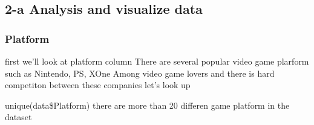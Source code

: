 \documentclass[]{article}
\newenvironment{Shaded}{\begin{snugshade}}{\end{snugshade}}
\newcommand{\DataTypeTok}[1]{\textcolor[rgb]{0.13,0.29,0.53}{#1}}
\newcommand{\KeywordTok}[1]{\textcolor[rgb]{0.13,0.29,0.53}{\textbf{#1}}}
\newcommand{\NormalTok}[1]{#1}
\newcommand{\OperatorTok}[1]{\textcolor[rgb]{0.81,0.36,0.00}{\textbf{#1}}}
\newcommand{\StringTok}[1]{\textcolor[rgb]{0.31,0.60,0.02}{#1}}
\begin{document}
\hypertarget{a-analysis-and-visualize-data}{%
\subsection{2-a Analysis and visualize
data}\label{a-analysis-and-visualize-data}}

\hypertarget{platform}{%
\subsubsection{Platform}\label{platform}}

first we'll look at platform column There are several popular video game
plarform such as Nintendo, PS, XOne Among video game lovers and there is
hard competiton between these companies let's look up

unique(data\$Platform) there are more than 20 differen game platform in
the dataset

\begin{Shaded}
\end{Shaded}
\end{document}
